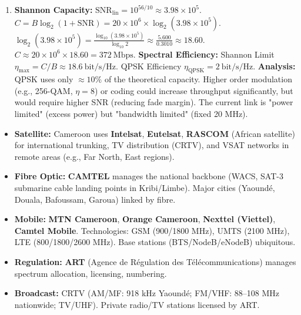 \documentclass[11pt]{article}
\begin{document}
\begin{exoresolu}
\begin{enumerate}
\item \textbf{Shannon Capacity:}
$\mathrm{SNR}_{\mathrm{lin}} = 10^{56/10} \approx 3.98 \times 10^5$.
$C = B \log_2(1 + \mathrm{SNR}) = 20 \times 10^6 \times \log_2(3.98 \times 10^5)$.
$\log_2(3.98 \times 10^5) = \frac{\log_{10}(3.98 \times 10^5)}{\log_{10}2} \approx \frac{5.600}{0.3010} \approx 18.60$.
$C \approx 20 \times 10^6 \times 18.60 = 372\ \mathrm{Mbps}$.
\textbf{Spectral Efficiency:}
Shannon Limit $\eta_{\max} = C/B \approx 18.6\ \mathrm{bit/s/Hz}$.
QPSK Efficiency $\eta_{\mathrm{QPSK}} = 2\ \mathrm{bit/s/Hz}$.
\textbf{Analysis:} QPSK uses only $\approx 10\%$ of the theoretical capacity. Higher order modulation (e.g., 256-QAM, $\eta=8$) or coding could increase throughput significantly, but would require higher SNR (reducing fade margin). The current link is "power limited" (excess power) but "bandwidth limited" (fixed 20 MHz).
\end{enumerate}
\end{exoresolu}

\begin{savaistu}
\begin{itemize}
\item \textbf{Satellite:} Cameroon uses \textbf{Intelsat}, \textbf{Eutelsat}, \textbf{RASCOM} (African satellite) for international trunking, TV distribution (CRTV), and VSAT networks in remote areas (e.g., Far North, East regions).
\item \textbf{Fibre Optic:} \textbf{CAMTEL} manages the national backbone (WACS, SAT-3 submarine cable landing points in Kribi/Limbe). Major cities (Yaoundé, Douala, Bafoussam, Garoua) linked by fibre.
\item \textbf{Mobile:} \textbf{MTN Cameroon}, \textbf{Orange Cameroon}, \textbf{Nexttel (Viettel)}, \textbf{Camtel Mobile}. Technologies: GSM (900/1800 MHz), UMTS (2100 MHz), LTE (800/1800/2600 MHz). Base stations (BTS/NodeB/eNodeB) ubiquitous.
\item \textbf{Regulation:} \textbf{ART} (Agence de Régulation des Télécommunications) manages spectrum allocation, licensing, numbering.
\item \textbf{Broadcast:} CRTV (AM/MF: 918 kHz Yaoundé; FM/VHF: 88--108 MHz nationwide; TV/UHF). Private radio/TV stations licensed by ART.
\end{itemize}
\end{savaistu}
\end{document}
